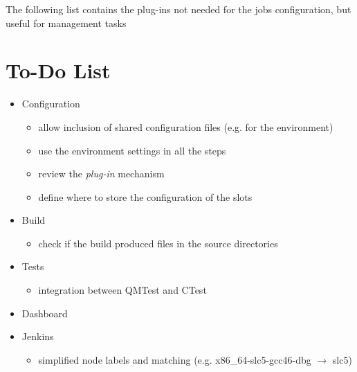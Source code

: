\documentclass{lhcbnote}
\begin{document}
The following list contains the plug-ins not needed for the jobs configuration,
but useful for management tasks
\begin{itemize}
\end{itemize}

\section{To-Do List}
\begin{itemize}
  \item Configuration
  \begin{itemize}
    \item allow inclusion of shared configuration files (e.g. for the
environment)
    \item use the environment settings in all the steps
    \item review the \emph{plug-in} mechanism
    \item define where to store the configuration of the slots
  \end{itemize}
  \item Build
  \begin{itemize}
    \item check if the build produced files in the source directories
  \end{itemize}
  \item Tests
  \begin{itemize}
    \item integration between QMTest and CTest
  \end{itemize}
  \item Dashboard
  \item Jenkins
  \begin{itemize}
    \item simplified node labels and matching (e.g. x86\_64-slc5-gcc46-dbg
$\rightarrow$ slc5)
  \end{itemize}

\end{itemize}
\end{document}

